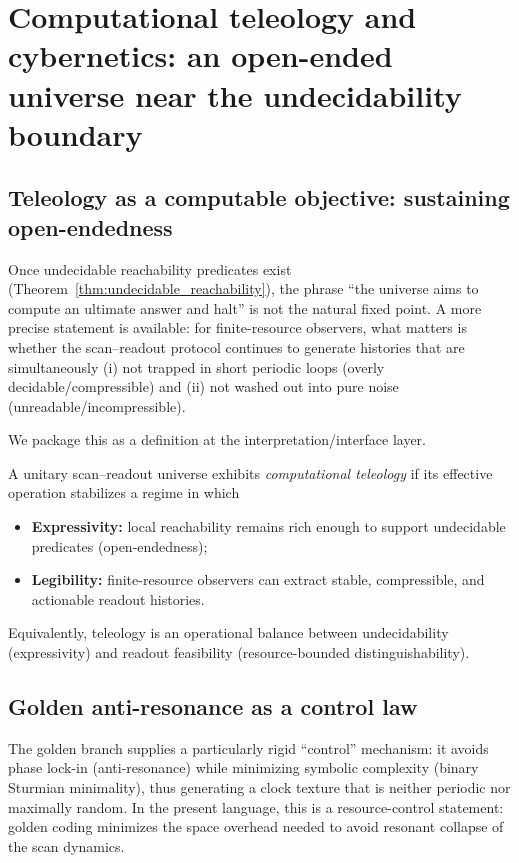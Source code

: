 \section{Computational teleology and cybernetics: an open-ended universe near the undecidability boundary}
\label{sec:teleology}

\subsection{Teleology as a computable objective: sustaining open-endedness}
Once undecidable reachability predicates exist (Theorem~\ref{thm:undecidable_reachability}), the phrase ``the universe aims to compute an ultimate answer and halt'' is not the natural fixed point.
A more precise statement is available: for finite-resource observers, what matters is whether the scan--readout protocol continues to generate histories that are simultaneously (i) not trapped in short periodic loops (overly decidable/compressible) and (ii) not washed out into pure noise (unreadable/incompressible).

We package this as a definition at the interpretation/interface layer.

\begin{definition}
\label{def:computational_teleology}
A unitary scan--readout universe exhibits \emph{computational teleology} if its effective operation stabilizes a regime in which
\begin{itemize}
    \item \textbf{Expressivity:} local reachability remains rich enough to support undecidable predicates (open-endedness);
    \item \textbf{Legibility:} finite-resource observers can extract stable, compressible, and actionable readout histories.
\end{itemize}
Equivalently, teleology is an operational balance between undecidability (expressivity) and readout feasibility (resource-bounded distinguishability).
\end{definition}

\subsection{Golden anti-resonance as a control law}
The golden branch supplies a particularly rigid ``control'' mechanism: it avoids phase lock-in (anti-resonance) while minimizing symbolic complexity (binary Sturmian minimality), thus generating a clock texture that is neither periodic nor maximally random.
In the present language, this is a resource-control statement: golden coding minimizes the space overhead needed to avoid resonant collapse of the scan dynamics.

